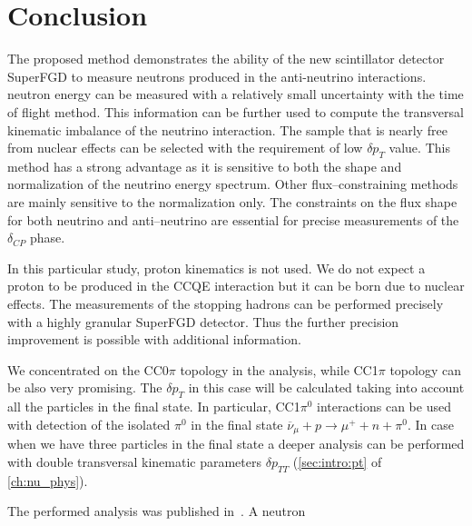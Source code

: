 \documentclass[main.tex]{subfiles}
\begin{document}
\section{Conclusion}
The proposed method demonstrates the ability of the new scintillator detector SuperFGD to measure neutrons produced in the anti-neutrino interactions. neutron energy can be measured with a relatively small uncertainty with the time of flight method. This information can be further used to compute the transversal kinematic imbalance of the neutrino interaction. The sample that is nearly free from nuclear effects can be selected with the requirement of low $\delta p_T$ value. This method has a strong advantage as it is sensitive to both the shape and normalization of the neutrino energy spectrum. Other flux--constraining methods are mainly sensitive to the normalization only. The constraints on the flux shape for both neutrino and anti--neutrino are essential for precise measurements of the $\delta_{CP}$ phase.

In this particular study, proton kinematics is not used. We do not expect a proton to be produced in the CCQE interaction but it can be born due to nuclear effects. The measurements of the stopping hadrons can be performed precisely with a highly granular SuperFGD detector. Thus the further precision improvement is possible with additional information.

We concentrated on the CC0$\pi$ topology in the analysis, while CC1$\pi$ topology can be also very promising. The $\delta p_T$ in this case will be calculated taking into account all the particles in the final state. In particular, CC1$\pi^0$ interactions can be used with detection of the isolated $\pi^0$ in the final state $\overline{\nu}_\mu+p\to\mu^++n+\pi^0$. In case when we have three particles in the final state a deeper analysis can be performed with double transversal kinematic parameters $\delta p_{TT}$ (\autoref{sec:intro:pt} of \autoref{ch:nu_phys}).

The performed analysis was published in~\cite{Munteanu2019}. A neutron 
\end{document}
